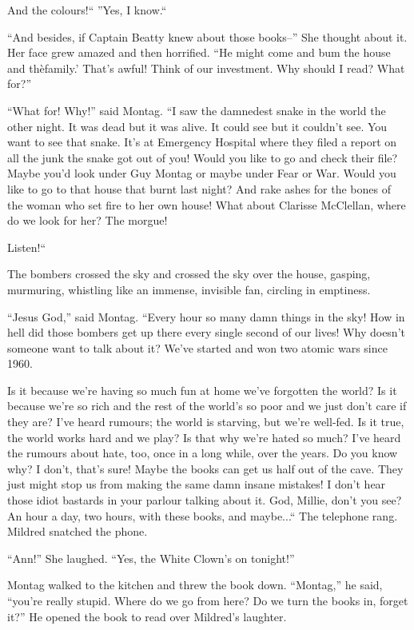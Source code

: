 \documentclass[11pt,openany]{book}
\begin{document}
And the colours!`` ''Yes, I know.``

``And besides, if Captain Beatty knew about those books--'' She thought about it. Her face grew amazed and then horrified. ``He might come and bum the house and thèfamily.' That's awful! Think of our investment. Why should I read? What for?''

``What for! Why!'' said Montag. ``I saw the damnedest snake in the world the other night. It was dead but it was alive. It could see but it couldn't see. You want to see that snake. It's at Emergency Hospital where they filed a report on all the junk the snake got out of you! Would you like to go and check their file? Maybe you'd look under Guy Montag or maybe under Fear or War. Would you like to go to that house that burnt last night? And rake ashes for the bones of the woman who set fire to her own house! What about Clarisse McClellan, where do we look for her? The morgue!

Listen!``

The bombers crossed the sky and crossed the sky over the house, gasping, murmuring, whistling like an immense, invisible fan, circling in emptiness.

``Jesus God,'' said Montag. ``Every hour so many damn things in the sky! How in hell did those bombers get up there every single second of our lives! Why doesn't someone want to talk about it? We've started and won two atomic wars since 1960.

Is it because we're having so much fun at home we've forgotten the world? Is it because we're so rich and the rest of the world's so poor and we just don't care if they are? I've heard rumours; the world is starving, but we're well-fed. Is it true, the world works hard and we play? Is that why we're hated so much? I've heard the rumours about hate, too, once in a long while, over the years. Do you know why? I don't, that's sure! Maybe the books can get us half out of the cave. They just might stop us from making the same damn insane mistakes! I don't hear those idiot bastards in your parlour talking about it. God, Millie, don't you see? An hour a day, two hours, with these books, and maybe...`` The telephone rang. Mildred snatched the phone.

``Ann!'' She laughed. ``Yes, the White Clown's on tonight!''

Montag walked to the kitchen and threw the book down. ``Montag,'' he said, ``you're really stupid. Where do we go from here? Do we turn the books in, forget it?'' He opened the book to read over Mildred's laughter.
\end{document}
